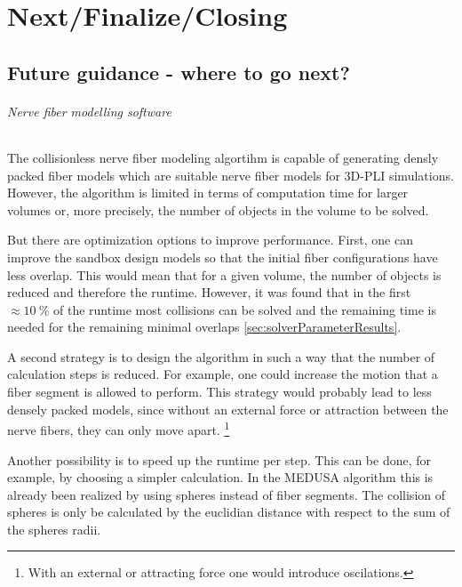 \newpage\null\thispagestyle{empty}\newpage
\clearpage{\thispagestyle{empty}\cleardoublepage}
\part{Next/Finalize/Closing}
% 
% 
% 
\setcounter{chapter}{9}
\chapter{Future guidance - where to go next?}
\label{sec:outlook}
% 
\paragraph{Nerve fiber modelling software}
% 
The collisionless nerve fiber modeling algortihm is capable of generating densly packed fiber models which are suitable nerve fiber models for \ac{3D-PLI} simulations.
However, the algorithm is limited in terms of computation time for larger volumes or, more precisely, the number of objects in the volume to be solved.
\par
% 
But there are optimization options to improve performance.
First, one can improve the sandbox design models so that the initial fiber configurations have less overlap.
This would mean that for a given volume, the number of objects is reduced and therefore the runtime.
However, it was found that in the first $\approx \SI{10}{\percent}$ of the runtime most collisions can be solved and the remaining time is needed for the remaining minimal overlaps \cref{sec:solverParameterResults}.
\par
% 
A second strategy is to design the algorithm in such a way that the number of calculation steps is reduced.
For example, one could increase the motion that a fiber segment is allowed to perform.
This strategy would probably lead to less densely packed models, since without an external force or attraction between the nerve fibers, they can only move apart. \footnote{With an external or attracting force one would introduce oscilations.}
% 
\par
Another possibility is to speed up the runtime per step.
This can be done, for example, by choosing a simpler calculation.
In the \ac{MEDUSA} algorithm this is already been realized by using spheres instead of fiber segments.
The collision of spheres is only be calculated by the euclidian distance with respect to the sum of the spheres radii.
